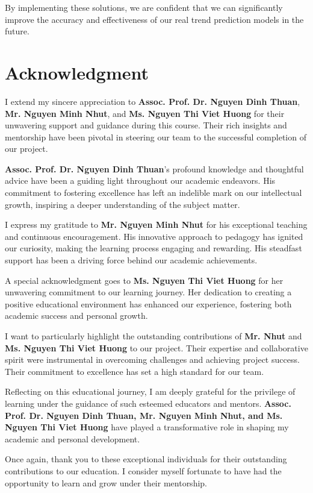 \documentclass{ieeeojies}
\begin{document}
By implementing these solutions, we are confident that we can significantly improve the accuracy and effectiveness of our real trend prediction models in the future.
\appendices
\vspace{-0.5cm}
\section*{\centering Acknowledgment}
\hspace{0.3cm}I extend my sincere appreciation to \textbf{Assoc. Prof. Dr. Nguyen Dinh Thuan}, \textbf{Mr. Nguyen Minh Nhut}, and \textbf{Ms. Nguyen Thi Viet Huong} for their unwavering support and guidance during this course. Their rich insights and mentorship have been pivotal in steering our team to the successful completion of our project.

\textbf{Assoc. Prof. Dr. Nguyen Dinh Thuan}'s profound knowledge and thoughtful advice have been a guiding light throughout our academic endeavors. His commitment to fostering excellence has left an indelible mark on our intellectual growth, inspiring a deeper understanding of the subject matter.

I express my gratitude to \textbf{Mr. Nguyen Minh Nhut} for his exceptional teaching and continuous encouragement. His innovative approach to pedagogy has ignited our curiosity, making the learning process engaging and rewarding. His steadfast support has been a driving force behind our academic achievements.

A special acknowledgment goes to \textbf{Ms. Nguyen Thi Viet Huong} for her unwavering commitment to our learning journey. Her dedication to creating a positive educational environment has enhanced our experience, fostering both academic success and personal growth.

I want to particularly highlight the outstanding contributions of \textbf{Mr. Nhut} and \textbf{Ms. Nguyen Thi Viet Huong} to our project. Their expertise and collaborative spirit were instrumental in overcoming challenges and achieving project success. Their commitment to excellence has set a high standard for our team.

Reflecting on this educational journey, I am deeply grateful for the privilege of learning under the guidance of such esteemed educators and mentors. \textbf{Assoc. Prof. Dr. Nguyen Dinh Thuan, Mr. Nguyen Minh Nhut, and Ms. Nguyen Thi Viet Huong} have played a transformative role in shaping my academic and personal development.

Once again, thank you to these exceptional individuals for their outstanding contributions to our education. I consider myself fortunate to have had the opportunity to learn and grow under their mentorship.
\EOD


\end{document}
